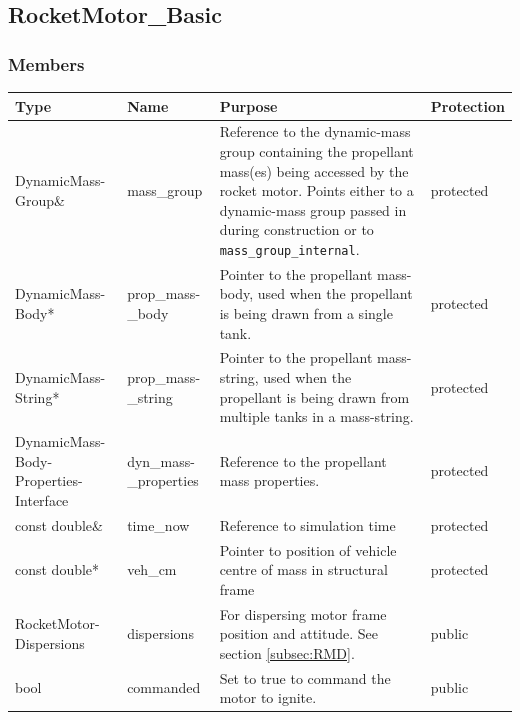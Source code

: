\documentclass[11pt,fleqn]{report}
\begin{document}
\subsection{RocketMotor\_Basic}
\subsubsection{Members}

\begin{center}
\begin{longtable}{|p{2.75cm}|p{2.8cm}|p{7.1cm}|l|} \hline
\textbf{Type} & \textbf{Name} & \textbf{Purpose} & \textbf{Protection} \\
\hline
\endhead
DynamicMass-\newline Group\& & mass\_group & Reference to the dynamic-mass group containing the propellant mass(es) being accessed by the rocket motor. Points either to a dynamic-mass group passed in during construction or to \verb|mass_group_internal|. & protected \\ \hline
DynamicMass-\newline Body* & prop\_mass-\newline \_body & Pointer to the propellant mass-body, used when the propellant is being drawn from a single tank. & protected \\
\hline
DynamicMass-\newline String* & prop\_mass-\newline \_string & Pointer to the propellant mass-string, used when the propellant is being drawn from multiple tanks in a mass-string. & protected \\ \hline
DynamicMass-\newline Body-\newline Properties-\newline Interface\newline & dyn\_mass-\newline \_properties & Reference to the propellant mass properties. & protected \\
\hline
const double\& & time\_now & Reference to simulation time & protected \\
\hline
const double* & veh\_cm & Pointer to position of vehicle centre of mass in structural frame & protected \\
\hline
RocketMotor-\newline Dispersions & dispersions & For dispersing motor frame position and attitude. See section  \ref{subsec:RMD}. & public \\
\hline
bool & commanded & Set to true to command the motor to ignite. & public \\

\end{longtable}
\end{center}
\end{document}

